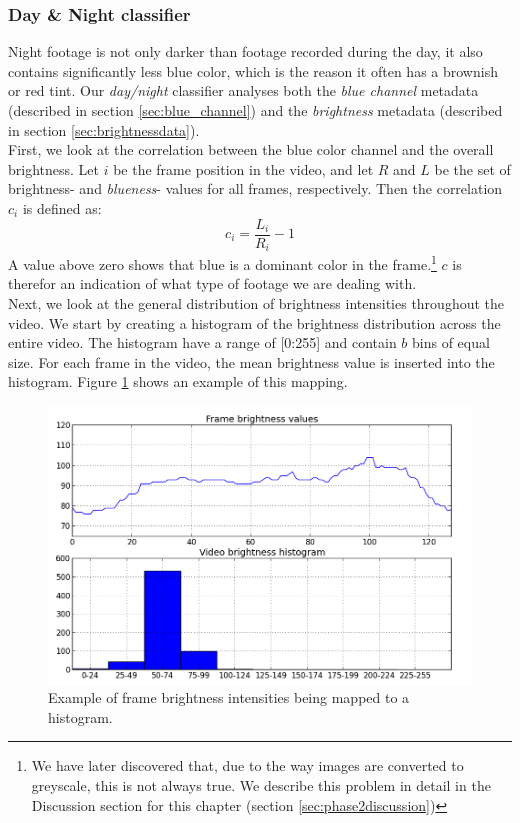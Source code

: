 \subsubsection{Day \& Night classifier}\label{sec:daynightclassifier}
%
Night footage is not only darker than footage recorded during the day, it also contains significantly less blue color, which is the reason it often has a brownish or red tint. Our \textit{day/night} classifier analyses both the \textit{blue channel} metadata (described in section \ref{sec:blue_channel}) and the \textit{brightness} metadata (described in section \ref{sec:brightnessdata}).\\
First, we look at the correlation between the blue color channel and the overall brightness. Let $i$ be the frame position in the video, and let $R$ and $L$ be the set of brightness- and \textit{blueness}- values for all frames, respectively. Then the correlation $c_{i}$ is defined as:\\
%
\begin{equation}
c_{i} = \frac{L_{i}}{R_{i}} - 1
\end{equation}
%
A value above zero shows that blue is a dominant color in the frame.\footnote{We have later discovered that, due to the way images are converted to greyscale, this is not always true. We describe this problem in detail in the Discussion section for this chapter (section \ref{sec:phase2discussion})}
$c$ is therefor an indication of what type of footage we are dealing with.\\
Next, we look at the general distribution of brightness intensities throughout the video. We start by creating a histogram of the brightness distribution across the entire video. The histogram have a range of [0:255] and contain $b$ bins of equal size. For each frame in the video, the mean brightness value is inserted into the histogram. Figure \ref{fig:brightness_histogram} shows an example of this mapping.
%
\begin{figure}
     \centering
     \includegraphics[width=1\textwidth]{img/brightness_histogram.png}
     \caption{Example of frame brightness intensities being mapped to a histogram.}\label{fig:brightness_histogram}
\end{figure}
